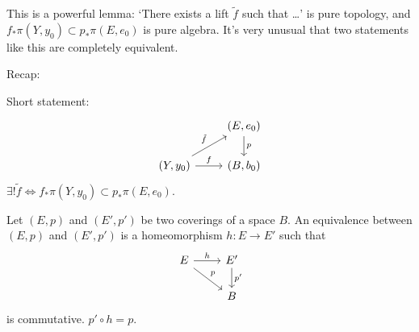 This is a powerful lemma: `There exists a lift $\tilde{f}$ such that \ldots' is pure topology, and $f_* \pi(Y,y_0) \subset p_* \pi(E,e_0) $ is pure algebra.
It's very unusual that two statements like this are completely equivalent.



Recap:
\begin{lemma}
    Short statement:
    \[
        \begin{tikzcd}
            & (E, e_0) \arrow[d, "p"]\\
            (Y, y_0) \arrow[r, "f"] \arrow[ur, "\tilde{f}"]&(B, b_0)
        \end{tikzcd}
    \] 
    $\exists ! \tilde{f} \iff f_* \pi(Y,y_0)  \subset p_* \pi(E,e_0) $.
\end{lemma}

\begin{definition}
    Let $(E, p)$ and $(E', p')$ be two coverings of a space $B$.
    An equivalence between $(E, p)$ and $(E', p')$ is a homeomorphism $h: E \to  E'$ such that
    \[
        \begin{tikzcd}
            E \arrow[r, "h"] \arrow[dr, "p"]& E' \arrow[d, "p'"]\\
                                            & B
        \end{tikzcd}
    \]
    is commutative. $p'  \circ  h = p$.
\end{definition}


